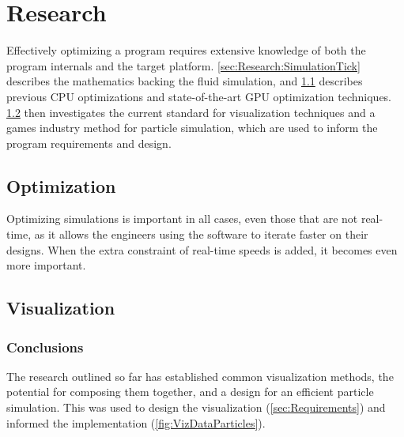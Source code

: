 
\chapter{Research}
\label{sec:Research} 
Effectively optimizing a program requires extensive knowledge of both the program internals and the target platform.
\cref{sec:Research:SimulationTick} describes the mathematics backing the fluid simulation, and \cref{sec:Research:Optimization} describes previous CPU optimizations and state-of-the-art GPU optimization techniques.
\cref{sec:Research:Visualization} then investigates the current standard for visualization techniques and a games industry method for particle simulation, which are used to inform the program requirements and design.



\section{Optimization}
\label{sec:Research:Optimization}
Optimizing simulations is important in all cases, even those that are not real-time, as it allows the engineers using the software to iterate faster on their designs.
When the extra constraint of real-time speeds is added, it becomes even more important.





\section{Visualization}\label{sec:Research:Visualization}









\subsection{Conclusions}
The research outlined so far has established common visualization methods, the potential for composing them together, and a design for an efficient particle simulation.
This was used to design the visualization (\cref{sec:Requirements}) and informed the implementation (\cref{fig:VizDataParticles}).